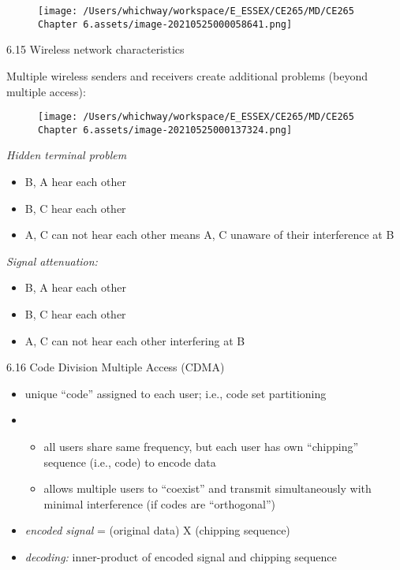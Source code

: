\documentclass[
]{article}
\begin{document}
\begin{figure}
\centering
\texttt{[image: /Users/whichway/workspace/E\_ESSEX/CE265/MD/CE265 Chapter 6.assets/image-20210525000058641.png]}
\caption{}
\end{figure}

6.15 Wireless network characteristics

Multiple wireless senders and receivers create additional problems
(beyond multiple access):

\begin{figure}
\centering
\texttt{[image: /Users/whichway/workspace/E\_ESSEX/CE265/MD/CE265 Chapter 6.assets/image-20210525000137324.png]}
\caption{}
\end{figure}

\emph{Hidden terminal problem}

\begin{itemize}
\item
  B, A hear each other
\item
  B, C hear each other
\item
  A, C can not hear each other means A, C unaware of their interference
  at B
\end{itemize}

\emph{Signal attenuation:}

\begin{itemize}
\item
  B, A hear each other
\item
  B, C hear each other
\item
  A, C can not hear each other interfering at B
\end{itemize}

6.16 Code Division Multiple Access (CDMA)

\begin{itemize}
\item
  unique ``code'' assigned to each user; i.e., code set partitioning
\item
  \begin{itemize}
  \item
    all users share same frequency, but each user has own ``chipping''
    sequence (i.e., code) to encode data
  \item
    allows multiple users to ``coexist'' and transmit simultaneously
    with minimal interference (if codes are ``orthogonal'')
  \end{itemize}
\item
  \emph{encoded signal} = (original data) X (chipping sequence)
\item
  \emph{decoding:} inner-product of encoded signal and chipping sequence
\end{itemize}
\end{document}
